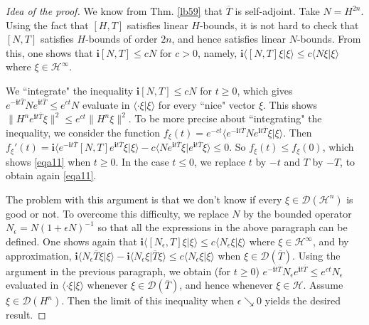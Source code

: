 \documentclass[12pt,b5paper,notitlepage]{article}
\theoremstyle{definition}
\theoremstyle{plain}
\newcommand{\mc}{\mathcal}
\newcommand{\ovl}{\overline}
\newcommand{\Dom}{\scr{D}}
\newcommand{\bk}[1]{\langle {#1}\rangle}
\newcommand{\scr}{\mathscr}
\newcommand{\im}{\mathbf{i}}
\numberwithin{equation}{section}
\begin{document}
\begin{proof}[Idea of the proof]
We know from Thm. \ref{lb59} that $\ovl T$ is self-adjoint. Take $N=H^{2n}$. Using the fact that $[H,T]$ satisfies linear $H$-bounds, it is not hard to check that $[N,T]$ satisfies $H$-bounds of order $2n$, and hence satisfies linear $N$-bounds. From this, one shows that $\im[N,T]\leq cN$ for $c>0$, namely, $\im\bk{[N,T]\xi|\xi}\leq c\bk{N\xi|\xi}$ where $\xi\in\mc H^\infty$.

We ``integrate" the inequality $\im[N,T]\leq cN$ for $t\geq 0$, which gives $e^{-\im t\ovl T}Ne^{\im t\ovl T}\leq e^{ct}N$ evaluate in $\bk{\cdot \xi|\xi}$ for every ``nice" vector $\xi$. This shows $\lVert H^ne^{\im t\ovl T}\xi\lVert^2\leq e^{ct}\lVert H^n\xi\lVert^2$. To be more precise about ``integrating" the inequality, we consider the function $f_\xi(t)=e^{-ct}\bk{e^{-\im t\ovl T}Ne^{\im t\ovl T}\xi|\xi}$. Then $f_\xi'(t)=\im\bk{e^{-\im t\ovl T}[N,T]e^{\im t\ovl T}\xi|\xi}- c\bk{Ne^{\im t\ovl T}\xi|e^{\im t\ovl T}\xi}\leq 0$. So $f_\xi(t)\leq f_\xi(0)$, which shows \eqref{eqa11} when $t\geq 0$. In the case $t\leq 0$, we replace $t$ by $-t$ and $T$ by $-T$, to obtain again \eqref{eqa11}.

The problem with this argument is that we don't know if every $\xi\in\Dom(\mc H^n)$ is good or not. To overcome this difficulty, we replace $N$ by the bounded operator $N_\epsilon=N(1+\epsilon N)^{-1}$ so that all the expressions in the above paragraph can be defined. One shows again that $\im\bk{[N_\epsilon,T]\xi|\xi}\leq c\bk{N_\epsilon\xi|\xi}$ where $\xi\in\mc H^\infty$, and by approximation, $\im\bk{N_\epsilon \ovl T\xi|\xi}-\im\bk{N_\epsilon\xi|\ovl T\xi}\leq c\bk{N_\epsilon\xi|\xi}$ when $\xi\in\Dom(\ovl T)$. Using the argument in the previous paragraph, we obtain (for $t\geq 0$) $e^{-\im t\ovl T}N_\epsilon e^{\im t\ovl T}\leq e^{ct}N_\epsilon$  evaluated in $\bk{\cdot \xi|\xi}$ whenever $\xi\in\Dom(\ovl T)$, and hence whenever $\xi\in\mc H$. Assume $\xi\in\Dom(H^n)$.  Then the limit of this inequality when $\epsilon\searrow0$ yields the desired result.
\end{proof}
\end{document}
